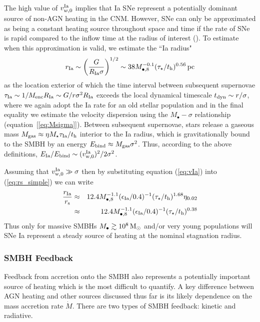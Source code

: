 \documentclass[usenatbib,fleqn]{mn2e}
\begin{document}
The high value of $v_{w,0}^{\rm Ia}$ implies that Ia SNe represent a potentially dominant source of non-AGN heating in the CNM.  However, SNe can only be approximated as being a constant heating source throughout space and time if the rate of SNe is rapid compared to the inflow time at the radius of interest (\citealt{ShcherbakovWong+:2014a}).  To estimate when this approximation is valid, we estimate the ``Ia radius"
  \begin{align}
    r_{\rm Ia} \sim \left(\frac{G}{R_{\rm Ia}\sigma}\right)^{1/2} \sim
    38 M_{\bullet,8}^{-0.1}(\tau_{\star}/t_{\rm h})^{0.56}\,{\rm pc}
    \label{eq:rIa}
  \end{align}
as the location exterior of which the time interval between subsequent supernovae $\tau_{\rm Ia} \sim 1/M_{\rm enc}R_{\rm Ia} \sim G/r\sigma^{2}R_{\rm Ia}$ exceeds the local dynamical timescale $t_{\rm
dyn} \sim r/\sigma$, where we again adopt the Ia rate for an old stellar population and in the final equality we estimate the velocity dispersion using the $M_{\bullet}-\sigma$ relationship
(equation~[\ref{eq:Msigma}]).  Between subsequent supernovae, stars release a gaseous mass $M_{\rm gas} \approx \eta M_{\star}\tau_{\rm Ia}/t_{\rm h}$ interior to the Ia radius, which is gravitationally bound to the SMBH by an energy $E_{\rm bind} \approx M_{\rm gas}\sigma^{2}$.  Thus, according to the above definitions, $E_{\rm Ia}/E_{\rm bind} \sim (v_{\rm w,0}^{\rm Ia})^{2}/2\sigma^{2}$.

Assuming that $v_{\rm w,0}^{\rm Ia} \gg \sigma$ then by substituting equation (\ref{eq:vIa}) into (\ref{eq:rs_simple}) we can write
\begin{eqnarray}
\frac{r_{\rm Ia}}{r_{\rm s}} &\approx& 12.4M_{\bullet,8}^{-1.1}(\epsilon_{\rm Ia}/0.4)^{-1}(\tau_{\star}/t_{\rm h})^{1.68}\eta_{0.02}  \nonumber \\
&\approx& 12.4M_{\bullet,8}^{-1.1}(\epsilon_{\rm Ia}/0.4)^{-1}(\tau_{\star}/t_{\rm h})^{0.38}
\end{eqnarray}
Thus only for massive SMBHs $M_{\bullet} \gtrsim 10^8 \,{\rm M_\odot}$ and/or very young populations will SNe Ia represent a steady source of heating at the nominal stagnation radius.

\subsubsection{SMBH Feedback}

Feedback from accretion onto the SMBH also represents a potentially important source of heating which is the most difficult to quantify.  A key difference between AGN heating and other sources discussed thus far is its likely dependence on the mass accretion rate $\dot{M}$.  There are two types of SMBH feedback: kinetic and radiative.
\end{document}
